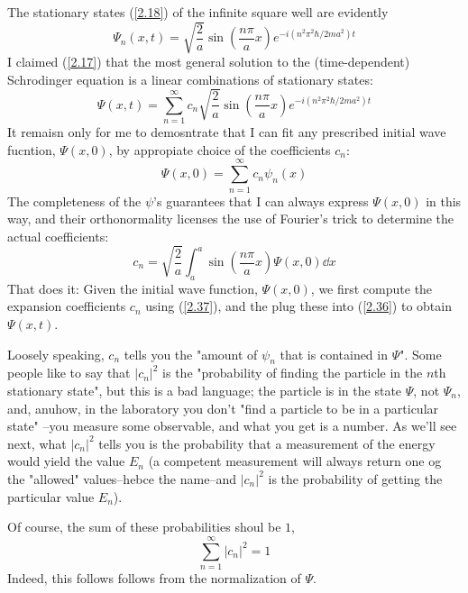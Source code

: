 The stationary states (\ref{2.18}) of the infinite square well are evidently
\begin{equation}\label{2.35}
	\Psi_n(x,t)=\sqrt{\frac{2}{a}}\sin\left(\frac{n\pi}{a}x\right)e^{-i(n^2\pi^2\hbar/2ma^2)t}
\end{equation}
I claimed (\ref{2.17}) that the most general solution to the (time-dependent) Schrodinger equation is a linear combinations of stationary states:
\begin{equation}\label{2.36}
	\Psi(x,t)=\sum_{n=1}^\infty c_n\sqrt{\frac{2}{a}}\sin\left(\frac{n\pi}{a}x\right)e^{-i(n^2\pi^2\hbar/2ma^2)t}
\end{equation}
It remaisn only for me to demosntrate that I can fit any prescribed initial wave fucntion, $\Psi(x,0)$, by appropiate choice of the coefficients $c_n$:
\begin{equation*}
	\Psi(x,0)=\sum_{n=1}^\infty c_n\psi_n(x)
\end{equation*}
The completeness of the $\psi$'s guarantees that I can always express $\Psi(x,0)$ in this way, and their orthonormality licenses the use of Fourier's trick to determine the actual coefficients:
\begin{equation}\label{2.37}
	c_n=\sqrt{\frac{2}{a}}\int_a^{a}\sin\left(\frac{n\pi}{a}x\right)\Psi(x,0)\dd x
\end{equation}
That does it: Given the initial wave function, $\Psi(x,0)$, we first compute the expansion coefficients $c_n$ using (\ref{2.37}), and the plug these into (\ref{2.36}) to obtain $\Psi(x,t)$.

Loosely speaking, $c_n$ tells you the "amount of $\psi_n$ that is contained in $\Psi$". Some people like to say that $|c_n|^2 $ is the "probability of finding the particle in the $n$th stationary state", but this is a bad language; the particle is in the state $\Psi$, not $\Psi_n$, and, anuhow, in the laboratory you don't "find a particle to be in a particular state" --you measure some observable, and what you get is a number. As we'll see next, what $|c_n|^2$ tells you is the probability that a measurement of the energy would yield the value $E_n$ (a competent measurement will always return one og the "allowed" values--hebce the name--and $|c_n|^2$ is the probability of getting the particular value $E_n$).

Of course, the sum of these probabilities shoul be $1$,
\begin{equation}\label{2.38}
	\boxed{\sum_{n=1}^\infty |c_n|^2=1}
\end{equation}
Indeed, this follows follows from the normalization of $\Psi$.

